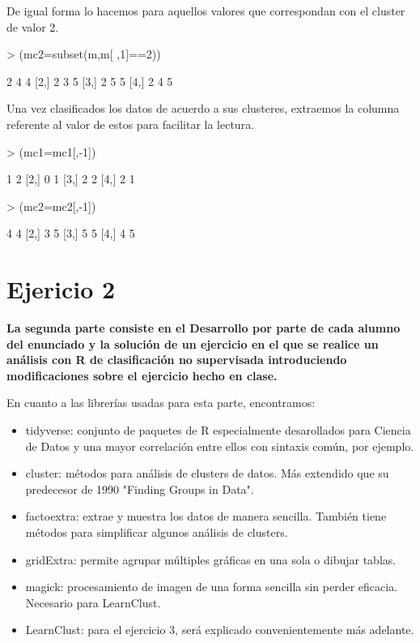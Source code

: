 \documentclass[a4paper]{article}
\begin{document}
De igual forma lo hacemos para aquellos valores que correspondan con el cluster de valor 2.
\begin{Schunk}
\begin{Sinput}
> (mc2=subset(m,m[ ,1]==2))
\end{Sinput}
\begin{Soutput}
     [,1] [,2] [,3]
[1,]    2    4    4
[2,]    2    3    5
[3,]    2    5    5
[4,]    2    4    5
\end{Soutput}
\end{Schunk}

Una vez clasificados los datos de acuerdo a sus clusteres, extraemos la columna referente al valor de estos para facilitar la lectura.

\begin{Schunk}
\begin{Sinput}
> (mc1=mc1[,-1])
\end{Sinput}
\begin{Soutput}
     [,1] [,2]
[1,]    1    2
[2,]    0    1
[3,]    2    2
[4,]    2    1
\end{Soutput}
\begin{Sinput}
> (mc2=mc2[,-1])
\end{Sinput}
\begin{Soutput}
     [,1] [,2]
[1,]    4    4
[2,]    3    5
[3,]    5    5
[4,]    4    5
\end{Soutput}
\end{Schunk}

\newpage
\section{Ejericio 2}
\textbf{La segunda parte consiste en el Desarrollo por parte de cada alumno del enunciado y la solución de un ejercicio en el que se realice un análisis con R de clasificación no supervisada introduciendo modificaciones sobre el ejercicio hecho en clase.}

En cuanto a las librerías usadas para esta parte, encontramos:
\begin{itemize}
     \item tidyverse: conjunto de paquetes de R especialmente desarollados para Ciencia de Datos y una mayor correlación entre ellos con sintaxis común, por ejemplo.
     \item cluster: métodos para análisis de clusters de datos. Más extendido que su predecesor de 1990 "Finding Groups in Data".
     \item factoextra: extrae y muestra los datos de manera sencilla. También tiene métodos para simplificar algunos análisis de clusters.
     \item gridExtra: permite agrupar múltiples gráficas en una sola o dibujar tablas.
     \item magick: procesamiento de imagen de una forma sencilla sin perder eficacia. Necesario para LearnClust.
     \item LearnClust: para el ejercicio 3, será explicado convenientemente más adelante.
\end{itemize}
\end{document}
